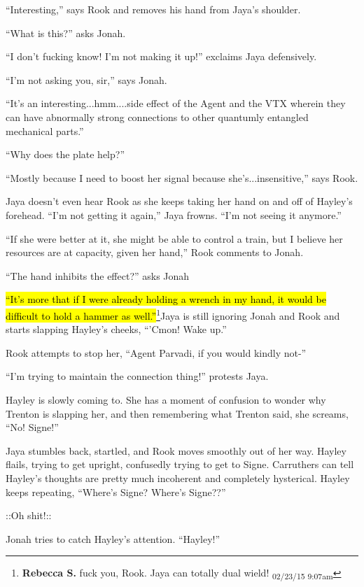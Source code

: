 ``Interesting,'' says Rook and removes his hand from Jaya's shoulder.

``What is this?'' asks Jonah.

``I don't fucking know!  I'm not making it up!'' exclaims Jaya defensively.

``I'm not asking you, sir,'' says Jonah.

``It's an interesting...hmm....side effect of the Agent and the VTX wherein they can have abnormally strong connections to other quantumly entangled mechanical parts.''

``Why does the plate help?''

``Mostly because I need to boost her signal because she's...insensitive,'' says Rook.

Jaya doesn't even hear Rook as she keeps taking her hand on and off of Hayley's forehead.  ``I'm not getting it again,'' Jaya frowns.  ``I'm not seeing it anymore.''

``If she were better at it, she might be able to control a train, but I believe her resources are at capacity, given her hand,'' Rook comments to Jonah.

``The hand inhibits the effect?'' asks Jonah

\hl{``It's more that if I were already holding a wrench in my hand, it would be difficult to hold a hammer as well.''}\footnote{\textbf{Rebecca S. }fuck you, Rook. Jaya can totally dual wield! \textsubscript{02/23/15 9:07am}}Jaya is still ignoring Jonah and Rook and starts slapping Hayley's cheeks, ``'Cmon!  Wake up.''

Rook attempts to stop her, ``Agent Parvadi, if you would kindly not-''

``I'm trying to maintain the connection thing!'' protests Jaya.



Hayley is slowly coming to.  She has a moment of confusion to wonder why Trenton is slapping her, and then remembering what Trenton said, she screams, ``No!  Signe!''  

Jaya stumbles back, startled, and Rook moves smoothly out of her way.  Hayley flails, trying to get upright, confusedly trying to get to Signe.   Carruthers can tell Hayley's thoughts are pretty much incoherent and completely hysterical.  Hayley keeps repeating, ``Where's Signe?  Where's Signe??'' 

 {\color[RGB]{153,0,255}::Oh shit!::} 

Jonah tries to catch Hayley's attention.  ``Hayley!''

